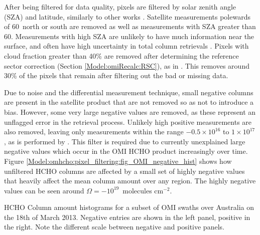     After being filtered for data quality, pixels are filtered by solar zenith angle (SZA) and latitude, similarly to other works \parencite[e.g.,][]{Marais2012, Barkley2013, Zhu2014, Bauwens2016, Zhu2016}.
    Satellite measurements polewards of 60\degr ~north or south are removed as well as measurements with SZA greater than 60\degr.
    Measurements with high SZA are unlikely to have much information near the surface, and often have high uncertainty in total column retrievals \parencite[e.g.,][]{Stone2015}.
    Pixels with cloud fraction greater than 40\% are removed after determining the reference sector correction (Section \ref{Model:omiRecalc:RSC}), as in \textcite{Abad2015, DeSmedt2015}.
    This removes around 30\% of the pixels that remain after filtering out the bad or missing data.

    Due to noise and the differential measurement technique, small negative columns are present in the satellite product that are not removed so as not to introduce a bias.
    However, some very large negative values are removed, as these represent an unflagged error in the retrieval process.
    Unlikely high positive measurements are also removed, leaving only measurements within the range $-0.5 \times 10^{16}$ to $1 \times 10^{17} $\moleccm, as is performed by \textcite{Zhu2016}.
    This filter is required due to currently unexplained large negative values which occur in the OMI HCHO product increasingly over time.
    Figure \ref{Model:omhcho:pixel_filtering:fig_OMI_negative_hist} shows how unfiltered HCHO columns are affected by a small set of highly negative values that heavily affect the mean column amount over any region.
    The highly negative values can be seen around $\Omega = -10^{19}$~molecules cm$^{-2}$.
    
    {
      HCHO Column amount histograms for a subset of OMI swaths over Australia on the 18th of March 2013.
      Negative entries are shown in the left panel, positive in the right.
      Note the different scale between negative and positive panels.
    }{\label{Model:omhcho:pixel_filtering:fig_OMI_negative_hist}}
  
  
  
